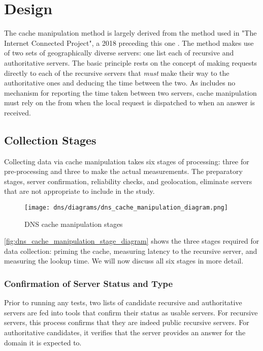 \section{Design}\label{sec:dns_design}
The \dns cache manipulation method is largely derived from the method used in "The Internet Connected Project", a 2018 \mqp preceding this one \cite{Fakult2019}. The method makes use of two sets of geographically diverse \dns servers: one list each of recursive and authoritative servers. The basic principle rests on the concept of making requests directly to each of the recursive servers that \textit{must} make their way to the authoritative ones and deducing the time between the two. As \dns includes no mechanism for reporting the time taken between two servers, \dns cache manipulation must rely on the \rtt from when the local request is dispatched to when an answer is received.

\subsection{Collection Stages}\label{sec:dns_design_collection_stages}

Collecting data via \dns cache manipulation takes six stages of processing: three for pre-processing and three to make the actual measurements. The preparatory stages, server confirmation, reliability checks, and geolocation, eliminate servers that are not appropriate to include in the study.

\begin{figure}[h]
    \centering
    \texttt{[image: dns/diagrams/dns\_cache\_manipulation\_diagram.png]}
    \caption{DNS cache manipulation stages}
    \label{fig:dns_cache_manipulation_stage_diagram}
\end{figure}

\autoref{fig:dns_cache_manipulation_stage_diagram} shows the three stages required for data collection: priming the \dns cache, measuring latency to the recursive \dns server, and measuring the lookup time. We will now discuss all six stages in more detail.

\subsubsection{Confirmation of Server Status and Type}\label{sec:dns_des_server_conf}
Prior to running any tests, two lists of candidate recursive and authoritative servers are fed into tools that confirm their status as usable servers. For recursive servers, this process confirms that they are indeed public recursive servers. For authoritative candidates, it verifies that the server provides an answer for the domain it is expected to.

